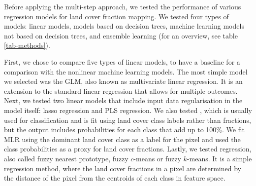 \documentclass[review,authoryear,3p]{elsarticle}
\begin{document}
Before applying the multi-step approach, we tested the performance of various regression models for land cover fraction mapping.
We tested four types of models: linear models, models based on decision trees, machine learning models not based on decision trees, and ensemble learning (for an overview, see table \ref{tab-methods}).


First, we chose to compare five types of linear models, to have a baseline for a comparison with the nonlinear machine learning models.
The most simple model we selected was the \gls{GLM}, also known as multivariate linear regression.
It is an extension to the standard linear regression that allows for multiple outcomes.
Next, we tested two linear models that include input data regularisation in the model itself: lasso regression and \gls{PLS} regression.
We also tested , which is usually used for classification and is fit using land cover class labels rather than fractions, but the output includes probabilities for each class that add up to 100\%.
We fit \gls{MLR} using the dominant land cover class as a label for the pixel and used the class probabilities as a proxy for land cover fractions.
Lastly, we tested  regression, also called fuzzy nearest prototype, fuzzy $c$-means or fuzzy $k$-means.
It is a simple regression method, where the land cover fractions in a pixel are determined by the distance of the pixel from the centroids of each class in feature space.

\end{document}
